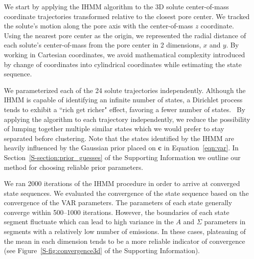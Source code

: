 \documentclass[journal=jpcbfk,manuscript=article]{achemso}
\begin{document}
  We start by applying the IHMM algorithm to the 3D solute center-of-mass coordinate 
  trajectories transformed relative to the closest pore center. We tracked the solute's
  motion along the pore axis with the center-of-mass $z$ coordinate. Using the nearest
  pore center as the origin, we represented the radial distance of each solute's 
  center-of-mass from the pore center in 2 dimensions, $x$ and $y$. By working in 
  Cartesian coordinates, we avoid mathematical complexity introduced by change of 
  coordinates into cylindrical coordinates while estimating the state sequence.

  We parameterized each of the 24 solute trajectories independently.
  Although the IHMM is capable of identifying an infinite number of states, 
  a Dirichlet process tends to exhibit a ``rich get richer" effect, favoring
  a fewer number of states.~\cite{dreyer_discovering_2011} By applying the algorithm to each trajectory 
  independently, we reduce the possibility of lumping together multiple 
  similar states which we would prefer to stay separated before clustering.
  Note that the states identified by the IHMM are heavily influenced by 
  the Gaussian prior placed on $\mathbf{c}$ in Equation~\ref{eqn:var}. 
  In Section~\ref{S-section:prior_guesses} of the Supporting Information we 
  outline our method for choosing reliable prior parameters. 

  We ran 2000 iterations of the IHMM procedure in order to arrive at converged 
  state sequences. We evaluated the convergence of the state sequence based on
  the convergence of the VAR parameters. The parameters of each state
  generally converge within 500--1000 iterations. However, the boundaries of 
  each state segment fluctuate which can lead to high variance in the $A$
  and $\Sigma$ parameters in segments with a relatively low number of emissions.
  In these cases, plateauing of the mean in each dimension tends to be a more 
  reliable indicator of convergence (see Figure~\ref{S-fig:convergence3d} of
  the Supporting Information).
  
  
\end{document}
